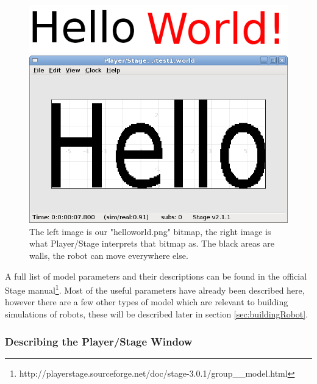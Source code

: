 \documentclass[a4paper]{report}
\newcommand{\plst}{Player/Stage\xspace}
\begin{document}
\begin{figure}
	\centering
	\begin{minipage}[c]{0.4\linewidth}
		\centering
		\includegraphics[width=\linewidth]{./pics/emptyWorld/writing.png}
		
	\end{minipage}%
	\hspace{0.05\linewidth}
	\begin{minipage}[c]{0.5\linewidth}
		\centering
		\includegraphics[width=\linewidth]{./pics/emptyWorld/bitmapHello.png} 
	\end{minipage}	
	\caption{The left image is our "helloworld.png" bitmap, the right image is what \plst interprets that bitmap as. The black areas are walls, the robot can move everywhere else.}
		\label{fig:helloWorldBitmap}
\end{figure}

A full list of model parameters and their descriptions can be found in the official Stage manual\footnote{http://playerstage.sourceforge.net/doc/stage-3.0.1/group\_\_model.html}. Most of the useful parameters have already been described here, however there are a few other types of model which are relevant to building simulations of robots, these will be described later in section \ref{sec:buildingRobot}.


\subsubsection{Describing the \plst Window}
\end{document}
